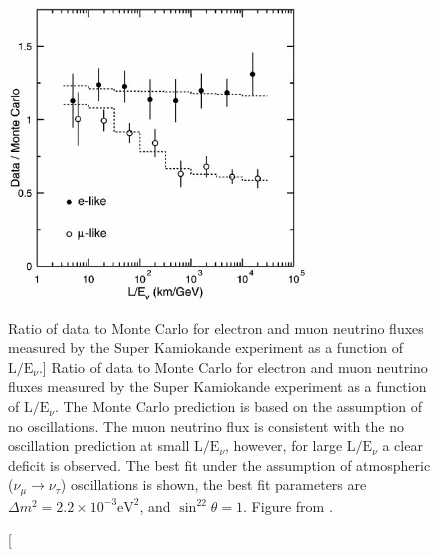 \begin{figure}

	\centering

	\includegraphics[width=0.7\textwidth]{figures/sk_flux.jpg}

	\caption
	[Ratio of data to Monte Carlo for electron and muon neutrino fluxes 
	measured by the Super Kamiokande experiment as a function of 
	\(\mbox{L} / \mbox{E}_\nu\).]
	{Ratio of data to Monte Carlo for electron and muon neutrino fluxes measured 
	by the Super Kamiokande experiment as a function of 
	\(\mbox{L} / \mbox{E}_\nu\). The Monte Carlo prediction is based on the
	assumption of no oscillations. The muon neutrino flux is consistent with the
	no oscillation prediction at small \(\mbox{L} / \mbox{E}_\nu\), however, for
	large \(\mbox{L} / \mbox{E}_\nu\) a clear deficit is observed. The best fit
	under the assumption of atmospheric (\(\nu_\mu \rightarrow \nu_\tau\))
	oscillations is shown, the best fit parameters are \(\Delta m^2 = 2.2 \times
	10^{-3} \mbox{eV}^2\), and \(\sin^22\theta = 1\). Figure from 
	\cite{Fukuda1998}.}
	\label{fig:sk_flux}

\end{figure}


